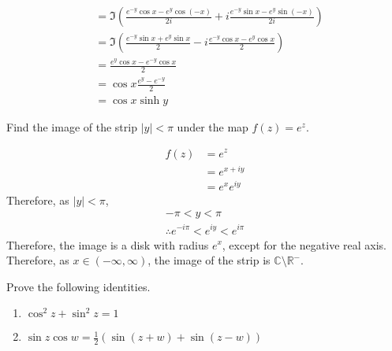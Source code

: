\documentclass[fleqn, a4paper, 11pt, oneside]{amsart}
\theoremstyle{definition}
\theoremstyle{theorem}
\begin{document}
\begin{solution}
\begin{align*}
                            & = \Im\left( \frac{e^{-y} \cos x - e^y \cos(-x)}{2 i} + i \frac{e^{-y} \sin x - e^y \sin(-x)}{2 i} \right) \\
                            & = \Im\left( \frac{e^{-y} \sin x + e^y \sin x}{2} - i \frac{e^{-y} \cos x - e^y \cos x}{2} \right)         \\
                            & = \frac{e^y \cos x - e^{-y} \cos x}{2}                                                                    \\
                            & = \cos x \frac{e^y - e^{-y}}{2}                                                                           \\
                            & = \cos x \sinh y
	\end{align*}
\end{solution}

\setcounter{question}{3}
\begin{question}
	Find the image of the strip $|y| < \pi$ under the map $f(z) = e^z$.
\end{question}

\begin{solution}
	\begin{align*}
		f(z) & = e^z         \\
                     & = e^{x + i y} \\
                     & = e^x e^{i y}
	\end{align*}
	Therefore, as $|y| < \pi$,
	\begin{gather*}
		-\pi < y < \pi\\
		\therefore e^{-i \pi} < e^{i y} < e^{i \pi}
	\end{gather*}
	Therefore, the image is a disk with radius $e^x$, except for the negative real axis.\\
	Therefore, as $x \in (-\infty,\infty)$, the image of the strip is $\mathbb{C} \setminus \mathbb{R}^-$.
\end{solution}

\setcounter{question}{5}
\begin{question}
	Prove the following identities.
	\begin{enumerate}
		\setcounter{enumi}{0}
		\item $\cos^2 z + \sin^2 z = 1$
		\item $\sin z \cos w = \frac{1}{2} \left( \sin(z + w) + \sin(z - w) \right)$
	\end{enumerate}
\end{question}
\end{document}
